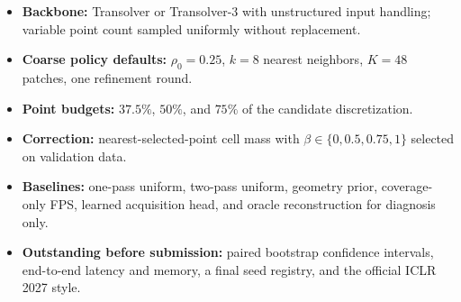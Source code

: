 \documentclass{article}
\begin{document}
\begin{itemize}
    \item \textbf{Backbone:} Transolver or Transolver-3 with unstructured input
    handling; variable point count sampled uniformly without replacement.
    \item \textbf{Coarse policy defaults:} $\rho_0=0.25$, $k=8$ nearest
    neighbors, $K=48$ patches, one refinement round.
    \item \textbf{Point budgets:} $37.5\%$, $50\%$, and $75\%$ of the candidate
    discretization.
    \item \textbf{Correction:} nearest-selected-point cell mass with
    $\beta\in\{0,0.5,0.75,1\}$ selected on validation data.
    \item \textbf{Baselines:} one-pass uniform, two-pass uniform, geometry
    prior, coverage-only FPS, learned acquisition head, and oracle
    reconstruction for diagnosis only.
    \item \textbf{Outstanding before submission:} paired bootstrap confidence
    intervals, end-to-end latency and memory, a final seed registry, and the
    official ICLR 2027 style.
\end{itemize}
\end{document}
